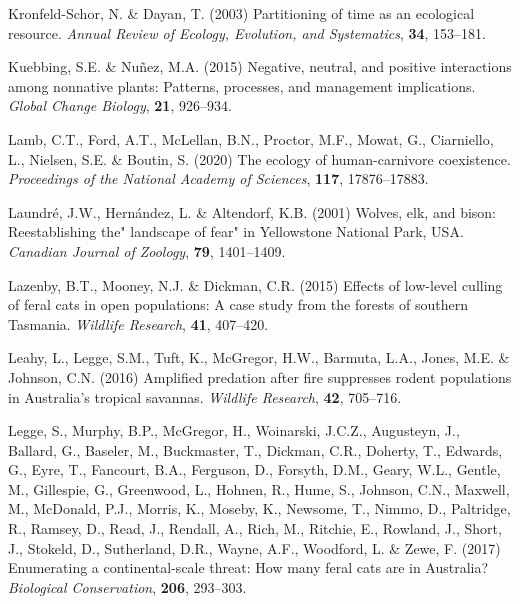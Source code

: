 \documentclass[11pt,a4paper,titlepage,twoside,openright]{style/unimelbthesis}
\begin{document}
\begin{mainmatter}
\leavevmode\hypertarget{ref-kronfeld2003partitioning}{}%
Kronfeld-Schor, N. \& Dayan, T. (2003) Partitioning of time as an ecological resource. \emph{Annual Review of Ecology, Evolution, and Systematics}, \textbf{34}, 153--181.

\leavevmode\hypertarget{ref-kuebbing2015negative}{}%
Kuebbing, S.E. \& Nuñez, M.A. (2015) Negative, neutral, and positive interactions among nonnative plants: Patterns, processes, and management implications. \emph{Global Change Biology}, \textbf{21}, 926--934.

\leavevmode\hypertarget{ref-lamb2020ecology}{}%
Lamb, C.T., Ford, A.T., McLellan, B.N., Proctor, M.F., Mowat, G., Ciarniello, L., Nielsen, S.E. \& Boutin, S. (2020) The ecology of human-carnivore coexistence. \emph{Proceedings of the National Academy of Sciences}, \textbf{117}, 17876--17883.

\leavevmode\hypertarget{ref-laundre2001wolves}{}%
Laundré, J.W., Hernández, L. \& Altendorf, K.B. (2001) Wolves, elk, and bison: Reestablishing the" landscape of fear" in Yellowstone National Park, USA. \emph{Canadian Journal of Zoology}, \textbf{79}, 1401--1409.

\leavevmode\hypertarget{ref-lazenby2015effects}{}%
Lazenby, B.T., Mooney, N.J. \& Dickman, C.R. (2015) Effects of low-level culling of feral cats in open populations: A case study from the forests of southern Tasmania. \emph{Wildlife Research}, \textbf{41}, 407--420.

\leavevmode\hypertarget{ref-leahy2016amplified}{}%
Leahy, L., Legge, S.M., Tuft, K., McGregor, H.W., Barmuta, L.A., Jones, M.E. \& Johnson, C.N. (2016) Amplified predation after fire suppresses rodent populations in Australia's tropical savannas. \emph{Wildlife Research}, \textbf{42}, 705--716.

\leavevmode\hypertarget{ref-legge2017enumerating}{}%
Legge, S., Murphy, B.P., McGregor, H., Woinarski, J.C.Z., Augusteyn, J., Ballard, G., Baseler, M., Buckmaster, T., Dickman, C.R., Doherty, T., Edwards, G., Eyre, T., Fancourt, B.A., Ferguson, D., Forsyth, D.M., Geary, W.L., Gentle, M., Gillespie, G., Greenwood, L., Hohnen, R., Hume, S., Johnson, C.N., Maxwell, M., McDonald, P.J., Morris, K., Moseby, K., Newsome, T., Nimmo, D., Paltridge, R., Ramsey, D., Read, J., Rendall, A., Rich, M., Ritchie, E., Rowland, J., Short, J., Stokeld, D., Sutherland, D.R., Wayne, A.F., Woodford, L. \& Zewe, F. (2017) Enumerating a continental-scale threat: How many feral cats are in Australia? \emph{Biological Conservation}, \textbf{206}, 293--303.


\end{mainmatter}
\end{document}
